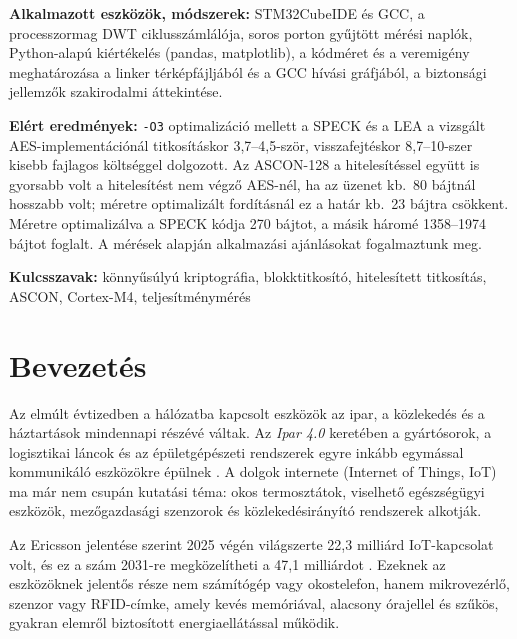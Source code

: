 \documentclass[a4paper,12pt]{report}
\theoremstyle{definition}
\theoremstyle{remark}
\begin{document}
\smallskip
\noindent\textbf{Alkalmazott eszközök, módszerek:} STM32CubeIDE és GCC, a processzormag DWT ciklusszámlálója, soros porton gyűjtött mérési naplók, Python-alapú kiértékelés (pandas, matplotlib), a kódméret és a veremigény meghatározása a linker térképfájljából és a GCC hívási gráfjából, a biztonsági jellemzők szakirodalmi áttekintése.

\smallskip
\noindent\textbf{Elért eredmények:} \texttt{-O3} optimalizáció mellett a SPECK és a LEA a vizsgált AES-implementációnál titkosításkor 3,7--4,5-ször, visszafejtéskor 8,7--10-szer kisebb fajlagos költséggel dolgozott. Az ASCON-128 a hitelesítéssel együtt is gyorsabb volt a hitelesítést nem végző AES-nél, ha az üzenet kb.\ 80 bájtnál hosszabb volt; méretre optimalizált fordításnál ez a határ kb.\ 23 bájtra csökkent. Méretre optimalizálva a SPECK kódja 270 bájtot, a másik háromé 1358--1974 bájtot foglalt. A mérések alapján alkalmazási ajánlásokat fogalmaztunk meg.

\smallskip
\noindent\textbf{Kulcsszavak:} könnyűsúlyú kriptográfia, blokktitkosító, hitelesített titkosítás, ASCON, Cortex-M4, teljesítménymérés

\begingroup
\singlespacing   %
\tableofcontents
\endgroup

\chapter{Bevezetés}

Az elmúlt évtizedben a hálózatba kapcsolt eszközök az ipar, a közlekedés és a háztartások mindennapi részévé váltak. Az \emph{Ipar 4.0} keretében a gyártósorok, a logisztikai láncok és az épületgépészeti rendszerek egyre inkább egymással kommunikáló eszközökre épülnek \cite{Sadeghi2015}. A dolgok internete (Internet of Things, IoT) ma már nem csupán kutatási téma: okos termosztátok, viselhető egészségügyi eszközök, mezőgazdasági szenzorok és közlekedésirányító rendszerek alkotják.

Az Ericsson jelentése szerint 2025 végén világszerte 22,3 milliárd IoT-kapcsolat volt, és ez a szám 2031-re megközelítheti a 47,1 milliárdot \cite{Ericsson2026}. Ezeknek az eszközöknek jelentős része nem számítógép vagy okostelefon, hanem mikrovezérlő, szenzor vagy RFID-címke, amely kevés memóriával, alacsony órajellel és szűkös, gyakran elemről biztosított energiaellátással működik.
\end{document}
